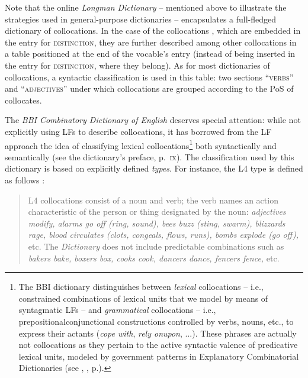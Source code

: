 Note that the online \textit{Longman Dictionary} \parencite{Longman2025} -- mentioned above to illustrate the strategies used in general-purpose dictionaries -- encapsulates a full-fledged dictionary of collocations. In the case of the collocations \Last[b--c], which are embedded in the entry for \textsc{distinction}, they are further described among other collocations in a table positioned at the end of the vocable's entry (instead of being inserted in the entry for \textsc{distinction}, where they belong). As for most dictionaries of collocations, a syntactic classification is used in this table: two sections ``\textsc{\textsf{verbs}}'' and ``\textsc{\textsf{adjectives}}'' under which collocations are grouped according to the PoS of collocates.

  The \textit{BBI Combinatory Dictionary of English} \parencite{BensonEtAl2010} deserves special attention: while not explicitly using LFs to describe collocations, it has borrowed from the LF approach the idea of classifying lexical collocations\footnote{\label{fn:BBIGrammaticalCollocation}The BBI dictionary distinguishes between \emph{lexical} collocations -- i.e., constrained combinations of lexical units that we model by means of syntagmatic LFs -- and \emph{grammatical} collocations -- i.e., prepositional\slashs conjunctional constructions controlled by verbs, nouns, etc., to express their actants (\textit{cope with}, \textit{rely on}\slashs\textit{upon}, ...). These  phrases are actually not collocations as they pertain to the active syntactic valence of predicative lexical units, modeled by government patterns in Explanatory Combinatorial Dictionaries (see , , p.\thinspace\pageref{para:activeSyntacticValence}).} both syntactically and semantically (see the dictionary's preface, p.~\textsc{ix}). The classification used by this dictionary is based on explicitly defined \textit{types}. For instance, the L4 type is defined as follows \parencite[\textsc{xxxiii}]{BensonEtAl2010}:

\begin{quote}
\small

L4 collocations consist of a noun and verb; the verb names an action characteristic of the person or thing designated by the noun: \textit{adjectives modify, alarms go off (ring, sound), bees buzz (sting, swarm), blizzards rage, blood circulates (clots, congeals, flows, runs), bombs explode (go off),} etc. The \textit{Dictionary} does not include predictable combinations such as \textit{bakers bake, boxers box, cooks cook, dancers dance, fencers fence,} etc.

\end{quote}

